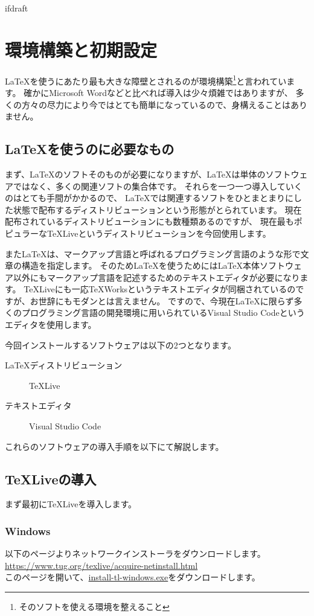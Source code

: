 \expandafter\ifx\csname ifdraft\endcsname\relax
    
    \graphicspath{{./figure/}}

\fi

\chapter{環境構築と初期設定}
	\LaTeX を使うにあたり最も大きな障壁とされるのが環境構築\footnote{そのソフトを使える環境を整えること}と言われています。
	確かにMicrosoft Wordなどと比べれば導入は少々煩雑ではありますが、
	多くの方々の尽力により今ではとても簡単になっているので、身構えることはありません。

	\section{\LaTeX を使うのに必要なもの}
		まず、\LaTeX のソフトそのものが必要になりますが、\LaTeX は単体のソフトウェアではなく、多くの関連ソフトの集合体です。
		それらを一つ一つ導入していくのはとても手間がかかるので、
		\LaTeX では関連するソフトをひとまとまりにした状態で配布するディストリビューションという形態がとられています。
		現在配布されているディストリビューションにも数種類あるのですが、
		現在最もポピュラーな\TeX Liveというディストリビューションを今回使用します。

		また\LaTeX は、マークアップ言語と呼ばれるプログラミング言語のような形で文章の構造を指定します。
		そのため\LaTeX を使うためには\LaTeX 本体ソフトウェア以外にもマークアップ言語を記述するためのテキストエディタが必要になります。
		\TeX Liveにも一応\TeX Worksというテキストエディタが同梱されているのですが、お世辞にもモダンとは言えません。
		ですので、今現在\LaTeX に限らず多くのプログラミング言語の開発環境に用いられているVisual Studio Codeというエディタを使用します。

		今回インストールするソフトウェアは以下の2つとなります。
		\begin{description}
			\item[\LaTeX ディストリビューション] \TeX Live
			\item[テキストエディタ] Visual Studio Code
		\end{description}
		これらのソフトウェアの導入手順を以下にて解説します。

	\section{\TeX Liveの導入}
		まず最初に\TeX Liveを導入します。

		\subsection{Windows}
			以下のページよりネットワークインストーラをダウンロードします。	\\
			\url{https://www.tug.org/texlive/acquire-netinstall.html}	\\
			このページを開いて、\url{install-tl-windows.exe}をダウンロードします。

